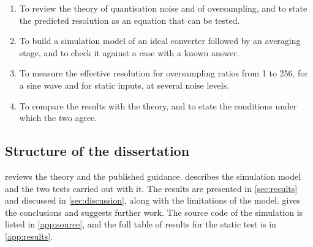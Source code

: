 \begin{enumerate}
  \item To review the theory of quantisation noise and of oversampling, and
        to state the predicted resolution as an equation that can be tested.
  \item To build a simulation model of an ideal converter followed by an
        averaging stage, and to check it against a case with a known answer.
  \item To measure the effective resolution for oversampling ratios from 1
        to 256, for a sine wave and for static inputs, at several noise
        levels.
  \item To compare the results with the theory, and to state the conditions
        under which the two agree.
\end{enumerate}

\subsection{Structure of the dissertation}

 reviews the theory and the published guidance.
 describes the simulation model and the two tests carried
out with it. The results are presented in \cref{sec:results} and discussed in
\cref{sec:discussion}, along with the limitations of the model.
 gives the conclusions and suggests further work. The
source code of the simulation is listed in \cref{app:source}, and the
full table of results for the static test is in \cref{app:results}.

